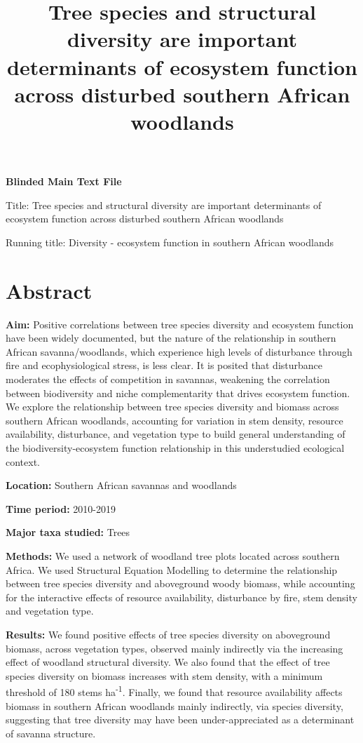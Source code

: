 \documentclass[11pt,a4paper]{article}
\title{Tree species and structural diversity are important determinants of ecosystem function across disturbed southern African woodlands}
\author{}
\date{}
\newcommand{\textapprox}{\raisebox{0.5ex}{\texttildelow}}  %
\begin{document}
{\LARGE{\textbf{Blinded Main Text File}}}

\LARGE{Title: Tree species and structural diversity are important determinants of ecosystem function across disturbed southern African woodlands}

\normalsize{Running title: Diversity - ecosystem function in southern African woodlands}

\section*{Abstract}

\textbf{Aim:} Positive correlations between tree species diversity and ecosystem function have been widely documented, but the nature of the relationship in southern African savanna/woodlands, which experience high levels of disturbance through fire and ecophysiological stress, is less clear. It is posited that disturbance moderates the effects of competition in savannas, weakening the correlation between biodiversity and niche complementarity that drives ecosystem function. We explore the relationship between tree species diversity and biomass across southern African woodlands, accounting for variation in stem density, resource availability, disturbance, and vegetation type to build general understanding of the biodiversity-ecosystem function relationship in this understudied ecological context.

\textbf{Location:} Southern African savannas and woodlands

\textbf{Time period:} 2010-2019

\textbf{Major taxa studied:} Trees

\textbf{Methods:} We used a network of \nplots{} woodland tree plots located across southern Africa. We used Structural Equation Modelling to determine the relationship between tree species diversity and aboveground woody biomass, while accounting for the interactive effects of resource availability, disturbance by fire, stem density and vegetation type.

\textbf{Results:} We found positive effects of tree species diversity on aboveground biomass, across vegetation types, observed mainly indirectly via the increasing effect of woodland structural diversity. We also found that the effect of tree species diversity on biomass increases with stem density, with a minimum threshold of \textapprox{}180 stems ha\textsuperscript{-1}. Finally, we found that resource availability affects biomass in southern African woodlands mainly indirectly, via species diversity, suggesting that tree diversity may have been under-appreciated as a determinant of savanna structure.
\end{document}

